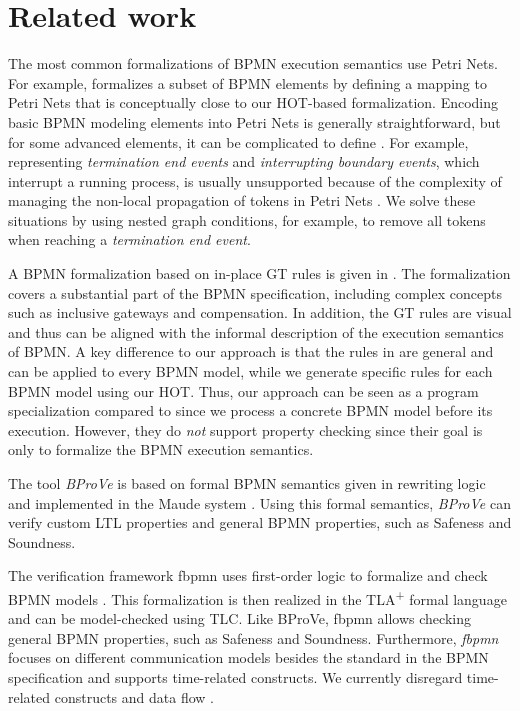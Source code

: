 \documentclass{lmcs} %
\begin{document}
\section{Related work} \label{sec:relatedWork}
The most common formalizations of BPMN execution semantics use Petri Nets.
For example, \cite{dijkmanSemanticsAnalysisBusiness2008} formalizes a subset of BPMN elements by defining a mapping to Petri Nets that is conceptually close to our HOT-based formalization.
Encoding basic BPMN modeling elements into Petri Nets is generally straightforward, but for some advanced elements, it can be complicated to define \cite{hofstedeWorkflowPatternsExpressive2002}.
For example, representing \textit{termination end events} and \textit{interrupting boundary events}, which interrupt a running process, is usually unsupported because of the complexity of managing the non-local propagation of tokens in Petri Nets \cite{corradiniFormalApproachAnalysis2021}.
We solve these situations by using nested graph conditions, for example, to remove all tokens when reaching a \textit{termination end event}.
 
A BPMN formalization based on in-place GT rules is given in \cite{vangorpVisualTokenbasedFormalization2013}.
The formalization covers a substantial part of the BPMN specification, including complex concepts such as inclusive gateways and compensation.
In addition, the GT rules are visual and thus can be aligned with the informal description of the execution semantics of BPMN.
A key difference to our approach is that the rules in \cite{vangorpVisualTokenbasedFormalization2013} are general and can be applied to every BPMN model, while we generate specific rules for each BPMN model using our HOT.
Thus, our approach can be seen as a program specialization compared to \cite{vangorpVisualTokenbasedFormalization2013} since we process a concrete BPMN model before its execution.
However, they do \textit{not} support property checking since their goal is only to formalize the BPMN execution semantics.

The tool \textit{BProVe} is based on formal BPMN semantics given in rewriting logic and implemented in the Maude system \cite{corradiniFormalApproachAnalysis2021}.
Using this formal semantics, \textit{BProVe} can verify custom LTL properties and general BPMN properties, such as Safeness and Soundness.

The verification framework \textsf{fbpmn} uses first-order logic to formalize and check BPMN models \cite{houhouFirstOrderLogicVerification2022}.
This formalization is then realized in the TLA\textsuperscript{+} formal language and can be model-checked using TLC.
Like BProVe, \textsf{fbpmn} allows checking general BPMN properties, such as Safeness and Soundness.
Furthermore, \textit{fbpmn} focuses on different communication models besides the standard in the BPMN specification and supports time-related constructs.
We currently disregard time-related constructs \cite{duranVerifyingTimedBPMN2017,houhouFirstOrderLogicVerification2022} and data flow \cite{corradiniFormalisingAnimatingMultiple2022,el-saberCMMICMComplianceChecking2015}.
\end{document}
